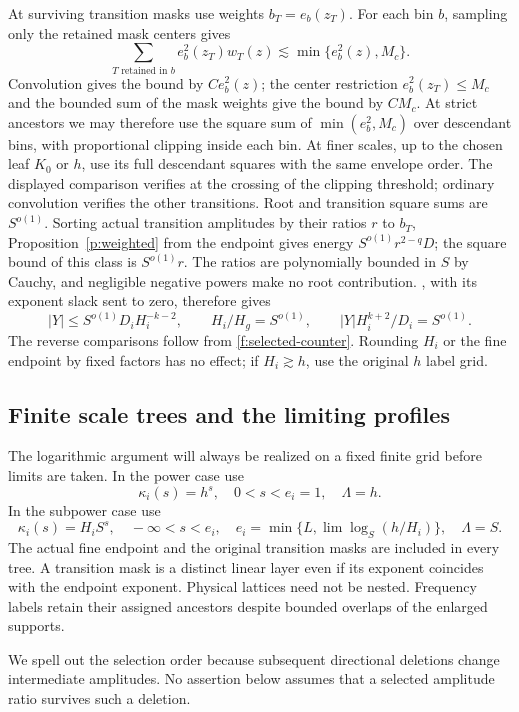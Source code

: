 At surviving transition masks use weights $b_T=e_b(z_T)$. For each
bin $b$, sampling only the retained mask centers gives
\[
 \sum_{T\text{ retained in }b}e_b^2(z_T)w_T(z)
 \lesssim \min\{e_b^2(z),M_c\}.
\]
Convolution gives the bound by $Ce_b^2(z)$; the center restriction
$e_b^2(z_T)\le M_c$ and the bounded sum of the mask weights give the
bound by $CM_c$. At strict ancestors we may therefore use the square
sum of $\min(e_b^2,M_c)$ over descendant bins, with proportional
clipping inside each bin. At finer scales, up to the chosen leaf
$K_0$ or $h$, use its full descendant squares with the same envelope
order. The displayed comparison verifies  at the
crossing of the clipping threshold; ordinary convolution verifies the
other transitions. Root and transition square sums are $S^{o(1)}$.
Sorting actual transition amplitudes by their ratios $r$ to $b_T$,
Proposition~\ref{p:weighted} from the endpoint gives energy
$S^{o(1)}r^{2-q}D$; the square bound of this class is $S^{o(1)}r$.
The ratios are polynomially bounded in $S$ by Cauchy, and negligible
negative powers make no root contribution. , with its exponent slack sent to zero, therefore
gives
\begin{equation}\label{f:subbalance}
 |Y|\le S^{o(1)}D_iH_i^{-k-2},\qquad
 H_i/H_g=S^{o(1)},\qquad |Y|H_i^{k+2}/D_i=S^{o(1)}.
\end{equation}
The reverse comparisons follow from \eqref{f:selected-counter}.
Rounding $H_i$ or the fine endpoint by fixed factors has no effect;
if $H_i\gtrsim h$, use the original $h$ label grid.

\subsection{Finite scale trees and the limiting profiles}

The logarithmic argument will always be realized on a fixed finite
grid before limits are taken. In the power case use
\[
 \kappa_i(s)=h^s,\quad0<s<e_i=1,\quad\Lambda=h.
\]
In the subpower case use
\[
 \kappa_i(s)=H_iS^s,\quad-\infty<s<e_i,
 \quad e_i=\min\{L,\lim\log_S(h/H_i)\},\quad\Lambda=S.
\]
The actual fine endpoint and the original transition masks are
included in every tree. A transition mask is a distinct linear layer
even if its exponent coincides with the endpoint exponent. Physical
lattices need not be nested. Frequency labels retain their assigned
ancestors despite bounded overlaps of the enlarged supports.

We spell out the selection order because subsequent directional
deletions change intermediate amplitudes. No assertion below assumes
that a selected amplitude ratio survives such a deletion.

